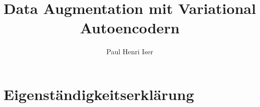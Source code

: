 \documentclass[ba,logo]{mlai-thesis}
\title{Data Augmentation mit Variational Autoencodern}
\author{Paul Henri Iser\\\birthinfo{02. Oktober 1998 in Bonn, Deutschland}}
\begin{document}
	
	\frontmatter
	
	
	
	\maketitle 
	\cleardoublepage
	
	
	\cleardoublepage
	
	\chapter*{Eigenst\"{a}ndigkeitserkl\"{a}rung}
	
	\cleardoublepage
	
	\tableofcontents
	
	\mainmatter
	
	
	
	
	
	
	
	
	
	
	
	
	
	
	
	
	
	\begingroup 
	
	\backmatter
		
	\printbibliography[heading=bibintoc]
	
	\listoffigures
	
	\listoftables
	
	\endgroup 
	
	\appendix	
	
\end{document}
